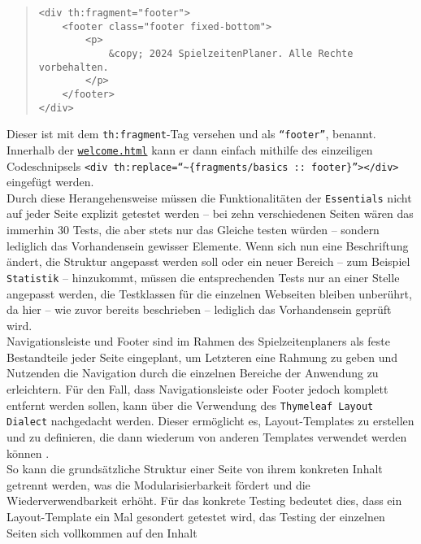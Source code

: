 \begin{quote}
\begin{verbatim}
<div th:fragment="footer">
    <footer class="footer fixed-bottom">
        <p>
            &copy; 2024 SpielzeitenPlaner. Alle Rechte vorbehalten. 
        </p>
    </footer>
</div>
\end{verbatim}
\end{quote}

Dieser ist mit dem \texttt{th:fragment}-Tag versehen und als \texttt{``footer''}, 
benannt. Innerhalb der \href{https://github.com/FlorianOhmes/bat_spielzeitenplaner/blob/main/spielzeitenplaner/src/main/resources/templates/welcome.html}{\texttt{welcome.html}}
kann er dann einfach mithilfe des einzeiligen Codeschnipsels
\texttt{<div \linebreak th:replace=``\textasciitilde\{fragments/basics :: footer\}''></div>}
eingefügt werden. \\ 
Durch diese Herangehensweise müssen die Funktionalitäten der \texttt{Essentials} 
nicht auf jeder Seite explizit getestet werden -- bei zehn verschiedenen Seiten 
wären das immerhin 30 Tests, die aber stets nur das Gleiche testen würden -- 
sondern lediglich das Vorhandensein gewisser Elemente. Wenn sich nun eine 
Beschriftung ändert, die Struktur angepasst werden soll oder ein neuer Bereich -- 
zum Beispiel \texttt{Statistik} -- hinzukommt, müssen die entsprechenden Tests nur 
an einer Stelle angepasst werden, die Testklassen für die einzelnen Webseiten 
bleiben unberührt, da hier -- wie zuvor bereits beschrieben -- lediglich das 
Vorhandensein geprüft wird. \\ 
Navigationsleiste und Footer sind im Rahmen des Spielzeitenplaners als feste 
Bestandteile jeder Seite eingeplant, um Letzteren eine Rahmung zu geben und 
Nutzenden die Navigation durch die einzelnen Bereiche der Anwendung zu erleichtern. 
Für den Fall, dass Navigationsleiste oder Footer jedoch komplett entfernt werden 
sollen, kann über die Verwendung des \texttt{Thymeleaf Layout Dialect} nachgedacht 
werden. Dieser ermöglicht es, Layout-Templates zu erstellen und zu definieren, die 
dann wiederum von anderen Templates verwendet werden können 
\cite{borowiec2024layouts}. \\ 
So kann die grundsätzliche Struktur einer Seite von ihrem konkreten Inhalt getrennt 
werden, was die Modularisierbarkeit fördert und die Wiederverwendbarkeit erhöht. 
Für das konkrete Testing bedeutet dies, dass ein Layout-Template ein Mal gesondert 
getestet wird, das Testing der einzelnen Seiten sich vollkommen auf den Inhalt 
